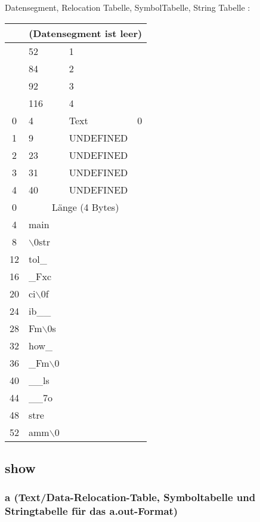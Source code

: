 \documentclass{ti2}
\begin{document}
Datensegment, Relocation Tabelle, SymbolTabelle, String Tabelle :\\
\begin{tabular}{|c| l l l|}	
	\hline
	& \multicolumn{3}{|c|}{(Datensegment ist leer)} \\
	\hline
	& 52 & 1 & \\
	\hline
	& 84 & 2 & \\
	\hline
	& 92 & 3 & \\
	\hline
	& 116 & 4 & \\
	\hline
	0 & 4 & Text & 0 \\
	\hline
	1 & 9 & UNDEFINED &  \\
	\hline
	2 & 23 & UNDEFINED &  \\
	\hline
	3 & 31 & UNDEFINED &  \\
	\hline
	4 & 40 & UNDEFINED &  \\
	\hline
	0 & \multicolumn{3}{|c|}{Länge (4 Bytes)} \\
	\hline
	4 & main & &  \\
	\hline
	8 & $\backslash0$str & & \\
	\hline
	12 & tol\_ & &  \\
	\hline
	16 & \_Fxc & & \\
	\hline
	20 & ci$\backslash0$f & &  \\
	\hline
	24 & ib\_\_ & & \\
	\hline
	28 & Fm$\backslash0$s & &  \\
	\hline
	32 & how\_ & & \\
	\hline
	36 & \_Fm$\backslash0$ & &  \\
	\hline
	40 & \_\_ls & & \\
	\hline
	44 & \_\_7o & &  \\
	\hline
	48 & stre & & \\
	\hline
	52 & amm$\backslash0$ & & \\
	\hline
\end{tabular}


\subsection{show}

\subsubsection{a (Text/Data-Relocation-Table, Symboltabelle und Stringtabelle für das a.out-Format)}
\end{document}
